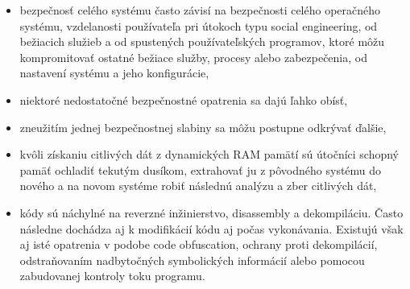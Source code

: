 \documentclass[12pt,a4wide,oneside,openright]{report}
\begin{document}
\begin{itemize}
\begin{itemize}
			\item bezpečnosť celého systému často závisí na bezpečnosti celého operačného systému, vzdelanosti používateľa pri útokoch typu social engineering, od bežiacich služieb a od spustených používateľských programov, ktoré môžu kompromitovať ostatné bežiace služby, procesy alebo zabezpečenia, od nastavení systému a jeho konfigurácie,
			\item niektoré nedostatočné bezpečnostné opatrenia sa dajú ľahko obísť,
			\item zneužitím jednej bezpečnostnej slabiny sa môžu postupne odkrývať ďalšie,
			\item kvôli získaniu citlivých dát z dynamických RAM pamätí sú útočníci schopný pamäť ochladiť tekutým dusíkom, extrahovať ju z pôvodného systému do nového a na novom systéme robiť následnú analýzu a zber citlivých dát,
			\item kódy sú náchylné na reverzné inžinierstvo, disassembly a dekompiláciu. Často následne dochádza aj k modifikácií kódu aj počas vykonávania. Existujú však aj isté opatrenia v podobe code obfuscation, ochrany proti dekompilácií, odstraňovaním nadbytočných symbolických informácií alebo pomocou zabudovanej kontroly toku programu.
		\end{itemize}
	\end{itemize}
	
\end{document}
